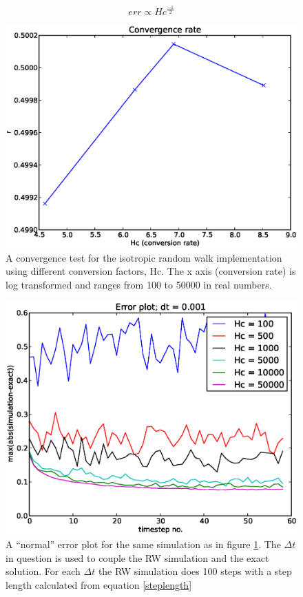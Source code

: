 \begin{equation}\label{convergence_rate_RW}
err \propto Hc^{\frac{-1}{2}}
\end{equation}


\begin{figure}[H]
 \centering
 \includegraphics[scale=0.7]{../doc/results/experiment_27112013_0837/resultsConvergenceTest.eps}
 \caption[Convergence test RW]{A convergence test for the isotropic random walk implementation using different conversion factors, Hc. The x axis (conversion rate) is log transformed and ranges from 100 to 50000 in real numbers.}
 \label{ConvergenceTestRW}
\end{figure}
\begin{figure}[H]
 \centering
 \includegraphics[scale=0.7]{../doc/results/experiment_24112013_1525/results/errorplot.eps}
 \caption[Error plot RW]{A ``normal'' error plot for the same simulation as in figure \ref{ConvergenceTestRW}. The $\Delta t$ in question is used to couple the RW simulation and the exact solution. For each $\Delta t$ the RW simulation does 100 steps with a step length calculated from equation \ref{steplength}}
\end{figure}

